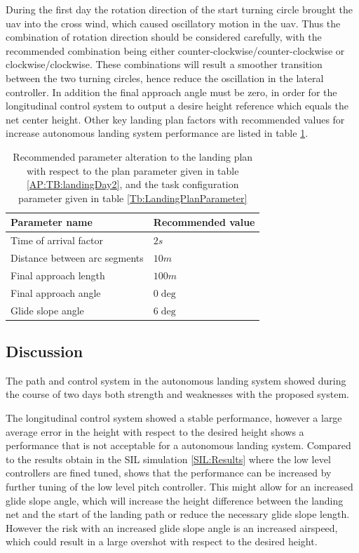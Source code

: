 During the first day the rotation direction of the start turning circle brought the \gls{uav} into the cross wind, which caused oscillatory motion in the \gls{uav}. Thus the combination of rotation direction should be considered carefully, with the recommended combination being either counter-clockwise/counter-clockwise or clockwise/clockwise. These combinations will result a smoother transition between the two turning circles, hence reduce the oscillation in the lateral controller. In addition the final approach angle must be zero, in order for the longitudinal control system to output a desire height reference which equals the net center height. Other key landing plan factors with recommended values for increase autonomous landing system performance are listed in table \ref{Tb:RecommmendedLandingPlanParameter}.
\begin{table}[H]
\centering
\begin{tabular}{| l | l |}
\hline
\textbf{Parameter name}			&  \textbf{Recommended value} 	\\ \hline
Time of arrival factor			&	$2 s$						\\ \hline
Distance between arc segments	&	$10 m$					 	\\ \hline
Final approach length			&	$100 m$					 	\\ \hline
Final approach angle			&   $0 \deg$					\\ \hline
Glide slope angle				&	$6 \deg$				 	\\ \hline
\end{tabular}
\caption{Recommended parameter alteration to the landing plan with respect to the plan parameter given in table \ref{AP:TB:landingDay2}, and the task configuration parameter given in table \ref{Tb:LandingPlanParameter}}
\label{Tb:RecommmendedLandingPlanParameter}
\end{table}
\subsection{Discussion}
The path and control system in the autonomous landing system showed during the course of two days both strength and weaknesses with the proposed system.

The longitudinal control system showed a stable performance, however a large average error in the height with respect to the desired height shows a performance that is not acceptable for a autonomous landing system. Compared to the results obtain in the SIL simulation \ref{SIL:Results} where the low level controllers are fined tuned, shows that the performance can be increased by further tuning of the low level pitch controller. This might allow for an increased glide slope angle, which will increase the height difference between the landing net and the start of the landing path or reduce the necessary glide slope length. However the risk with an increased glide slope angle is an increased airspeed, which could result in a large overshot with respect to the desired height. 

